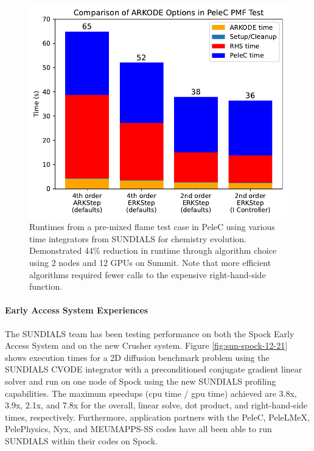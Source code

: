 \begin{figure}[htb]
  \centering
  \includegraphics[width=0.6\linewidth]{projects/2.3.3-MathLibs/2.3.3.12-SUNDIALS-hypre/PeleC_fig.pdf}
  \caption{\label{fig:sun-many-demo} Runtimes from a pre-mixed flame test case
  in PeleC using various time integrators from SUNDIALS for chemistry evolution.
  Demonstrated 44\% reduction in runtime through algorithm choice using 2 nodes
  and 12 GPUs on Summit. Note that more efficient algorithms required fewer
  calls to the expensive right-hand-side function.}
\end{figure}

\paragraph{Early Access System Experiences}
The SUNDIALS team has been testing performance on both the Spock Early Access System and on the new Crusher system.  Figure \ref{fig:sun-spock-12-21} shows execution times for a 2D diffusion benchmark problem using the SUNDIALS CVODE integrator with a preconditioned conjugate gradient linear solver and run on one node of Spock using the new SUNDIALS profiling capabilities.  The maximum speedups (cpu time / gpu time) achieved are 3.8x, 3.9x, 2.1x, and 7.8x for the overall, linear solve, dot product, and right-hand-side times, respectively.  Furthermore, application partners with the PeleC, PeleLMeX, PelePhysics, Nyx, and MEUMAPPS-SS codes have all been able to run SUNDIALS within their codes on Spock. 

